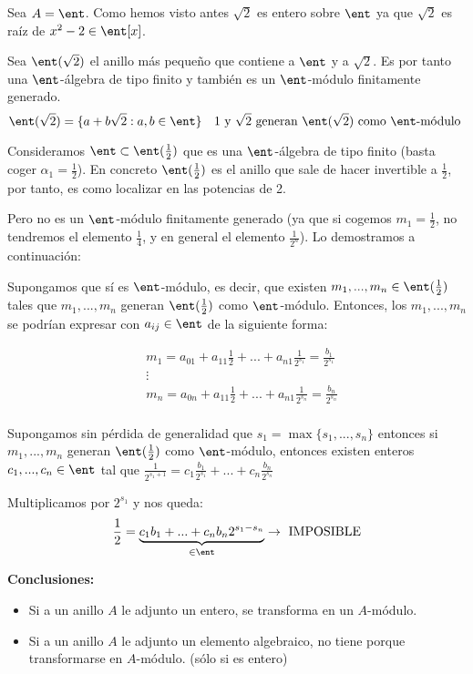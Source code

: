 \begin{example}
	Sea $A= \ent$. Como hemos visto antes $\sqrt{2}$ es entero sobre $\ent$ ya que $\sqrt{2}$ es raíz de $x^2-2 \in \ent[x]$.
	
	Sea $\ent(\sqrt{2})$ el anillo más pequeño que contiene a $\ent$ y a $\sqrt{2}$. Es por tanto una $\ent$-álgebra de tipo finito y también es un $\ent$-módulo finitamente generado.
	$$ \ent(\sqrt{2})=\{ a+b\sqrt{2}:a,b \in \ent \} \quad \text {1 y }\sqrt{2} \text{ generan } \ent(\sqrt{2}) \text{ como } \ent\text{-módulo }$$
	
	Consideramos $\ent \subset \ent(\frac{1}{2})$ que es una $\ent$-álgebra de tipo finito (basta coger $\alpha_1=\frac{1}{2}$). En concreto  $\ent(\frac{1}{2})$ es el anillo que sale de hacer invertible a $\frac{1}{2}$, por tanto, es como localizar en las potencias de 2.
	
	Pero no es un $\ent$-módulo finitamente generado (ya que si cogemos $m_1=\frac{1}{2}$, no tendremos el elemento $\frac{1}{4}$, y en general el elemento $\frac{1}{2^n}$). Lo demostramos a continuación:
	
	Supongamos que sí es $\ent$-módulo, es decir, que existen $m_1,...,m_n \in \ent(\frac{1}{2})$ tales que $m_1,...,m_n$ generan $\ent(\frac{1}{2})$ como $\ent$-módulo. Entonces, los $m_1,...,m_n$ se podrían expresar con $a_{ij} \in \ent$ de la siguiente forma:
	
	\begin{align*}
		& m_1=a_{01}+a_{11}\frac{1}{2}+...+a_{n1}\frac{1}{2^{s_1}} = \frac{b_1}{2^{s_1}} \\
		& \vdots \\
		& m_n=a_{0n}+a_{11}\frac{1}{2}+...+a_{n1}\frac{1}{2^{s_n}} = \frac{b_n}{2^{s_n}} \\
	\end{align*}
	
	Supongamos sin pérdida de generalidad que  $s_1 = \max\{s_1,...,s_n\}$ entonces si $m_1,...,m_n$ generan $\ent(\frac{1}{2})$ como $\ent$-módulo, entonces existen enteros $c_1,...,c_n \in \ent$ tal que $\frac{1}{2^{s_1+1}}=c_1\frac{b_1}{2^{s_1}}+...+c_n\frac{b_n}{2^{s_n}}$ 
	
	Multiplicamos por $2^{s_1}$ y nos queda:
	$$ \frac{1}{2} = \underbrace{c_1 b_1+...+c_nb_n2^{s_1-s_n}}_{\in \ent} \rightarrow \text{ IMPOSIBLE} $$	
\end{example}

\textbf{Conclusiones:}
\begin{itemize}
	\item Si a un anillo $A$ le adjunto un entero, se transforma en un $A$-módulo.
	\item Si a un anillo $A$ le adjunto un elemento algebraico, no tiene porque transformarse en $A$-módulo. (sólo si es entero)
\end{itemize}

